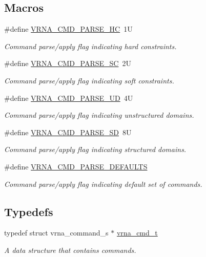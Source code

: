 \subsection*{Macros}
\begin{DoxyCompactItemize}
\item 
\#define \hyperlink{group__command__files_gac54dec838d7b6bebd5df85f71702d324}{V\+R\+N\+A\+\_\+\+C\+M\+D\+\_\+\+P\+A\+R\+S\+E\+\_\+\+HC}~1U
\begin{DoxyCompactList}\small\item\em Command parse/apply flag indicating hard constraints. \end{DoxyCompactList}\item 
\#define \hyperlink{group__command__files_ga8cad3c1f83e6f149829c49a186a83e21}{V\+R\+N\+A\+\_\+\+C\+M\+D\+\_\+\+P\+A\+R\+S\+E\+\_\+\+SC}~2U
\begin{DoxyCompactList}\small\item\em Command parse/apply flag indicating soft constraints. \end{DoxyCompactList}\item 
\#define \hyperlink{group__command__files_ga6c6409780698826b04ebfed9151d7649}{V\+R\+N\+A\+\_\+\+C\+M\+D\+\_\+\+P\+A\+R\+S\+E\+\_\+\+UD}~4U
\begin{DoxyCompactList}\small\item\em Command parse/apply flag indicating unstructured domains. \end{DoxyCompactList}\item 
\#define \hyperlink{group__command__files_gaf5e20210173cdb83bf70256a454f284b}{V\+R\+N\+A\+\_\+\+C\+M\+D\+\_\+\+P\+A\+R\+S\+E\+\_\+\+SD}~8U
\begin{DoxyCompactList}\small\item\em Command parse/apply flag indicating structured domains. \end{DoxyCompactList}\item 
\#define \hyperlink{group__command__files_ga0a6c88e21e366dca14958d69cd024008}{V\+R\+N\+A\+\_\+\+C\+M\+D\+\_\+\+P\+A\+R\+S\+E\+\_\+\+D\+E\+F\+A\+U\+L\+TS}
\begin{DoxyCompactList}\small\item\em Command parse/apply flag indicating default set of commands. \end{DoxyCompactList}\end{DoxyCompactItemize}
\subsection*{Typedefs}
\begin{DoxyCompactItemize}
\item 
\mbox{\label{group__command__files_gaf31afe4c5f8e4bf44a670ab4c3dcd916}} 
typedef struct vrna\+\_\+command\+\_\+s $\ast$ \hyperlink{group__command__files_gaf31afe4c5f8e4bf44a670ab4c3dcd916}{vrna\+\_\+cmd\+\_\+t}
\begin{DoxyCompactList}\small\item\em A data structure that contains commands. \end{DoxyCompactList}\end{DoxyCompactItemize}
